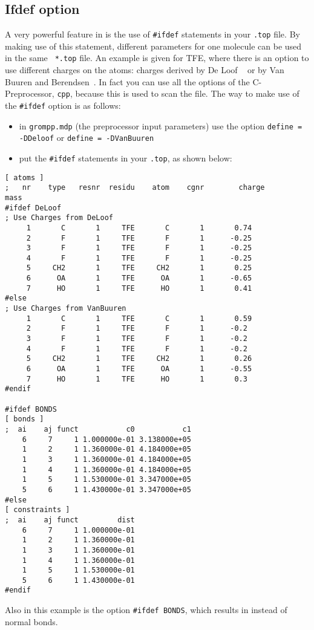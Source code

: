 \subsection{Ifdef option}
\label{subsec:ifdef}
A very powerful feature in {\gromacs} is the use of \verb'#ifdef'
statements in your {\tt *.top} file. By making use of this statement,
different parameters for one molecule can be used in the same {\tt
*.top} file. An example is given for TFE, where there is an option to
use different charges on the atoms: charges derived by De Loof
{\etal}~\cite{Loof92} or by Van Buuren and
Berendsen~\cite{Buuren93a}. In fact you can use all the options of the
C-Preprocessor, {\tt cpp}, because this is used to scan the file.  The
way to make use of the \verb'#ifdef' option is as follows:
\begin{itemize}
\item in {\tt grompp.mdp} (the {\gromacs} preprocessor input
      parameters) use the option \verb'define = -DDeloof' or
      \verb'define = -DVanBuuren'
\item put the {\tt \#ifdef} statements in your {\tt *.top}, as
      shown below: 
\end{itemize}
{\small\begin{verbatim}
[ atoms ]
;   nr    type   resnr  residu    atom    cgnr        charge          mass
#ifdef DeLoof
; Use Charges from DeLoof
     1       C       1     TFE       C       1		 0.74
     2       F       1     TFE       F       1		-0.25
     3       F       1     TFE       F       1		-0.25
     4       F       1     TFE       F       1		-0.25
     5     CH2       1     TFE     CH2       1		 0.25
     6      OA       1     TFE      OA       1		-0.65
     7      HO       1     TFE      HO       1		 0.41
#else
; Use Charges from VanBuuren
     1       C       1     TFE       C       1		 0.59
     2       F       1     TFE       F       1		-0.2
     3       F       1     TFE       F       1		-0.2
     4       F       1     TFE       F       1		-0.2
     5     CH2       1     TFE     CH2       1		 0.26
     6      OA       1     TFE      OA       1		-0.55
     7      HO       1     TFE      HO       1		 0.3
#endif

#ifdef BONDS
[ bonds ]
;  ai    aj funct           c0           c1
    6     7     1 1.000000e-01 3.138000e+05 
    1     2     1 1.360000e-01 4.184000e+05 
    1     3     1 1.360000e-01 4.184000e+05 
    1     4     1 1.360000e-01 4.184000e+05 
    1     5     1 1.530000e-01 3.347000e+05 
    5     6     1 1.430000e-01 3.347000e+05 
#else
[ constraints ]
;  ai    aj funct         dist
    6     7     1 1.000000e-01
    1     2     1 1.360000e-01
    1     3     1 1.360000e-01
    1     4     1 1.360000e-01
    1     5     1 1.530000e-01
    5     6     1 1.430000e-01
#endif
\end{verbatim}
}
Also in this example is the option {\tt \#ifdef BONDS}, which results
in  instead of normal bonds.

